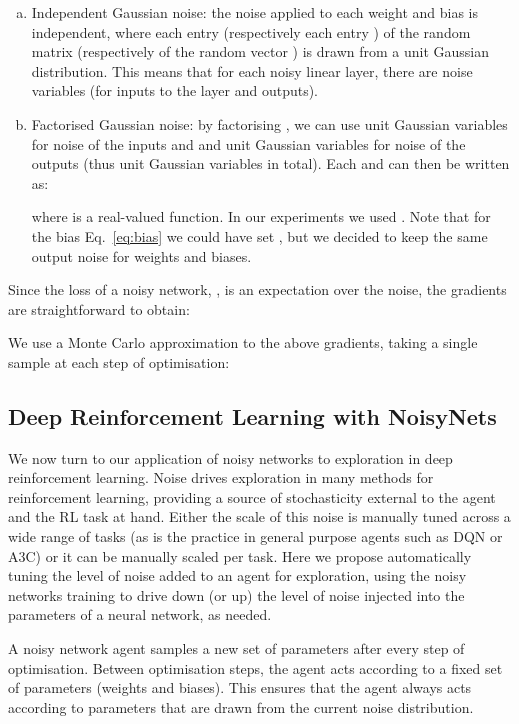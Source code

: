 \documentclass{article}
\begin{document}
\begin{enumerate}[(a)]
    \item Independent Gaussian noise: the noise applied to each weight and bias is independent, where each entry  (respectively each entry ) of the random matrix  (respectively of the random vector ) is drawn from a unit Gaussian distribution.
    This means that for each noisy linear layer, there are  noise variables (for  inputs to the layer and  outputs).
    \item Factorised Gaussian noise: by factorising , we can use  unit Gaussian variables  for noise of the inputs and
and  unit Gaussian variables  for noise of the outputs (thus  unit Gaussian variables in total). 
Each  and  can then be written as:

where  is a real-valued  function.
In our experiments we used . Note that for the bias Eq.~\eqref{eq:bias} we could have set , but we decided to keep the same output noise for weights and biases.
\end{enumerate}
Since the loss of a noisy network, , is an expectation over the noise, the gradients are straightforward to obtain:

We use a Monte Carlo approximation to the above gradients, taking a single sample  at each step of optimisation:

\subsection{Deep Reinforcement Learning with NoisyNets}
\label{sec:Reinforcement Learning using Randomised Networks}
We now turn to our application of noisy networks to exploration in deep reinforcement learning.
Noise drives exploration in many methods for reinforcement learning, providing a source of stochasticity external to the agent and the RL task at hand.
Either the scale of this noise is manually tuned across a wide range of tasks (as is the practice in general purpose agents such as DQN or A3C) or it can be manually scaled per task.
Here we propose automatically tuning the level of noise added to an agent for exploration, using the noisy networks training to drive down (or up) the level of noise injected into the parameters of a neural network, as needed.

A noisy network agent samples a new set of parameters after every step of optimisation.
Between optimisation steps, the agent acts according to a fixed set of parameters (weights and biases).
This ensures that the agent always acts according to parameters that are drawn from the current noise distribution.
\end{document}
